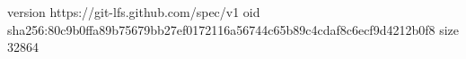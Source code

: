 version https://git-lfs.github.com/spec/v1
oid sha256:80c9b0ffa89b75679bb27ef0172116a56744c65b89c4cdaf8c6ecf9d4212b0f8
size 32864
